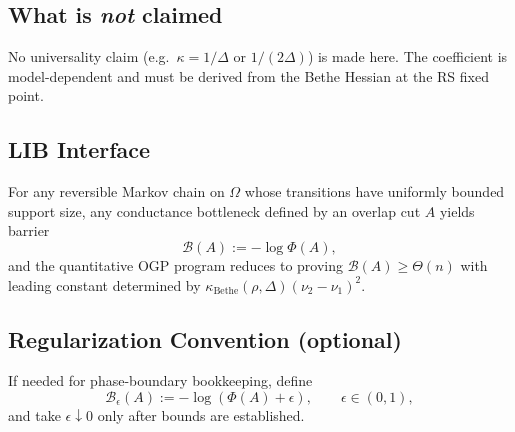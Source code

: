 \subsection*{What is \emph{not} claimed}

No universality claim (e.g.\ $\kappa=1/\Delta$ or $1/(2\Delta)$) is made here.
The coefficient is model-dependent and must be derived from the Bethe Hessian at the RS fixed point.

\subsection*{LIB Interface}

For any reversible Markov chain on $\Omega$ whose transitions have uniformly bounded support size, any conductance bottleneck defined by an overlap cut $A$ yields barrier
\[
\mathcal B(A):=-\log\Phi(A),
\]
and the quantitative OGP program reduces to proving $\mathcal B(A)\ge \Theta(n)$ with leading constant determined by $\kappa_{\mathrm{Bethe}}(\rho,\Delta)(\nu_2-\nu_1)^2$.

\subsection*{Regularization Convention (optional)}

If needed for phase-boundary bookkeeping, define
\[
\mathcal B_\epsilon(A):=-\log(\Phi(A)+\epsilon),\qquad \epsilon\in(0,1),
\]
and take $\epsilon\downarrow 0$ only after bounds are established.
